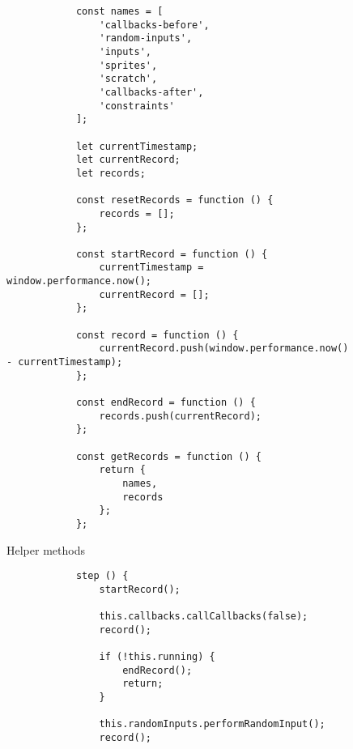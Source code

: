 \begin{listing}[htpb]
    \centering

    \begin{subfigure}[b]{.40\textwidth}
        \begin{verbatim}
            const names = [
                'callbacks-before',
                'random-inputs',
                'inputs',
                'sprites',
                'scratch',
                'callbacks-after',
                'constraints'
            ];

            let currentTimestamp;
            let currentRecord;
            let records;

            const resetRecords = function () {
                records = [];
            };

            const startRecord = function () {
                currentTimestamp = window.performance.now();
                currentRecord = [];
            };

            const record = function () {
                currentRecord.push(window.performance.now() - currentTimestamp);
            };

            const endRecord = function () {
                records.push(currentRecord);
            };

            const getRecords = function () {
                return {
                    names,
                    records
                };
            };
        \end{verbatim}
        \vspace{-\bigskipamount}
        \caption{Helper methods}
    \end{subfigure}
    \hspace{.08\textwidth}
    \begin{subfigure}[b]{.40\textwidth}
        \begin{verbatim}
            step () {
                startRecord();

                this.callbacks.callCallbacks(false);
                record();

                if (!this.running) {
                    endRecord();
                    return;
                }

                this.randomInputs.performRandomInput();
                record();


\end{verbatim}
\end{subfigure}
\end{listing}
